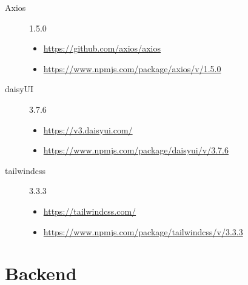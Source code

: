 \begin{description}
    \item[Axios] 1.5.0
    \begin{itemize}
        \item \url{https://github.com/axios/axios}
        \item \url{https://www.npmjs.com/package/axios/v/1.5.0}
    \end{itemize}

    \item[daisyUI] 3.7.6
    \begin{itemize}
        \item \url{https://v3.daisyui.com/}
        \item \url{https://www.npmjs.com/package/daisyui/v/3.7.6}
    \end{itemize}

    \item[tailwindcss] 3.3.3
    \begin{itemize}
        \item \url{https://tailwindcss.com/}
        \item \url{https://www.npmjs.com/package/tailwindcss/v/3.3.3}
    \end{itemize}

\end{description}

\section*{Backend}

